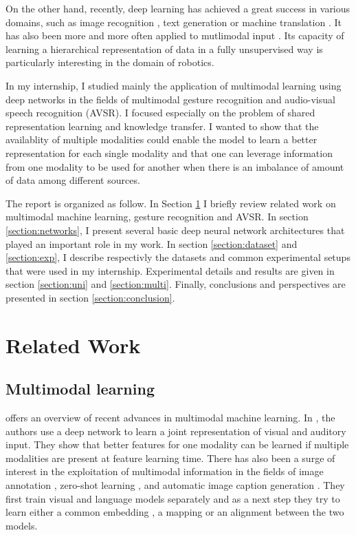 On the other hand, recently, deep learning has achieved a great success in
various domains, such as image recognition \cite{A. Krizhevsky 2012},
text generation \cite{A. Graves 2013} or
machine translation \cite{I. Sutskever 2014}.
It has also been more and more often applied to mutlimodal input
\cite{J. Ngiam 2011, T. Baltrusaitis 2017}.
Its capacity of learning a hierarchical representation of data in a
fully unsupervised way \cite{P. Vincent 2010, A. Radford 2015}
is particularly interesting in the domain of robotics.

In my internship, I studied mainly the application of multimodal learning
using deep networks in the fields of multimodal gesture recognition
and audio-visual speech recognition (AVSR).
I focused especially on the problem
of shared representation learning and knowledge transfer. I wanted to show
that the availablity of multiple modalities could enable the model
to learn a better representation for each single modality and that one can
leverage information from one modality to be used for another when there
is an imbalance of amount of data among different sources.

The report is organized as follow. In Section \ref{section:related} I
briefly review related work on multimodal machine learning, gesture
recognition and AVSR. In section \ref{section:networks}, I present
several basic deep neural network architectures that played an important
role in my work. In section \ref{section:dataset} and
\ref{section:exp}, I describe respectivly the datasets and common
experimental setups that were used in my internship. Experimental
details and results are given in section \ref{section:uni} and
\ref{section:multi}. Finally, conclusions and perspectives are
presented in section \ref{section:conclusion}.

\section{Related Work} \label{section:related}

\subsection{Multimodal learning}

\cite{T. Baltrusaitis 2017} offers an overview of recent advances in
multimodal machine learning. In \cite{J. Ngiam 2011}, the authors
use a deep network to learn a joint representation of visual and auditory
input. They show that better features for one modality can be learned if
multiple modalities are present at feature learning time. 
There has also been a surge of interest in the exploitation of multimodal
information in the fields of image annotation \cite{J. Weston 2010},
zero-shot learning \cite{A. Frome 2013, R. Socher 2013}, and automatic
image caption generation \cite{A. Karpathy 2015}. They first train
visual and language models separately and as a next step they try
to learn either a common embedding \cite{J. Weston 2010}, a mapping
\cite{A. Frome 2013, R. Socher 2013} or an alignment \cite{A. Karpathy 2015}
between the two models.

